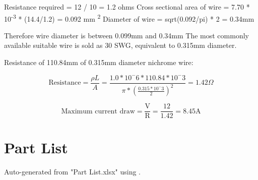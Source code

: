 Resistance required = 12 / 10 = 1.2 ohms
Cross sectional area of wire = 7.70 * 10\textsuperscript{-3} * (14.4/1.2) = 0.092 mm \textsuperscript{2}
Diameter of wire = sqrt(0.092/pi) * 2 = 0.34mm

Therefore wire diameter is between 0.099mm and 0.34mm
The most commonly available suitable wire is sold as 30 SWG, equivalent to 0.315mm diameter.

Resistance of 110.84mm of 0.315mm diameter nichrome wire:

\begin{displaymath}
\text{Resistance} = \frac{\rho L}{A}
= \frac{1.0*10^-6*110.84*10^-3}{\pi*(\frac{0.315*10^-3}{2})^2}
= 1.42 \Omega
\end{displaymath}



\begin{displaymath}
\text{Maximum current draw} = \frac{\text{V}}{\text{R}}
= \frac{12}{1.42}
= 8.45 \text{A}
\end{displaymath}

\newpage
\section{Part List}

Auto-generated from "Part List.xlsx" using \cite{excel2latex}.


